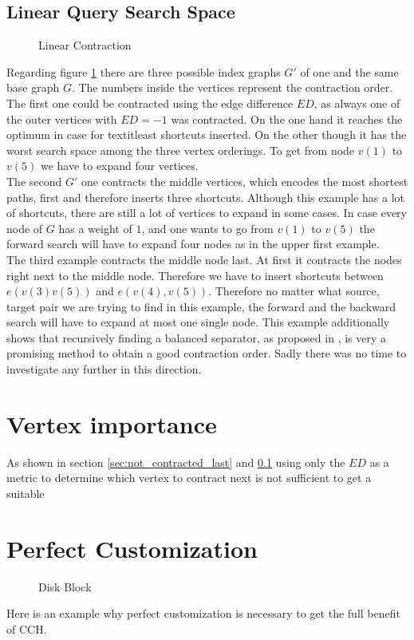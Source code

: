 \subsection{Linear Query Search Space}\label{sec:linear_query}

\begin{figure}
\centering

\caption{Linear Contraction}
\label{fig:linear_contraction}
\end{figure}

Regarding figure \ref{fig:linear_contraction} there are three possible index graphs $G'$ of one and the same base graph $G$. The numbers inside the vertices represent the contraction order.
\\
The first one could be contracted using the edge difference $ED$, as always one of the outer vertices with $ED=-1$ was contracted. On the one hand it reaches the optimum in case for textit{least shortcuts inserted}. On the other though it has the worst search space among the three vertex orderings. 
To get from node $v(1)$ to $v(5)$ we have to expand four vertices. 
\\
The second $G'$ one contracts the middle vertices, which encodes the most shortest paths, first and therefore inserts three shortcuts. Although this example has a lot of shortcuts, there are still a lot of vertices to expand in some cases. In case every node of $G$ has a weight of $1$, and one wants to go from $v(1)$ to $v(5)$ the forward search will have to expand four nodes as in the upper first example.
\\
The third example contracts the middle node last. At first it contracts the nodes right next to the middle node. Therefore we have to insert shortcuts between $e(v(3)v(5))$ and $e(v(4), v(5))$.
Therefore no matter what source, target pair we are trying to find in this example, the forward and the backward search will have to expand at most one single node. This example additionally shows that
recursively finding a balanced separator, as proposed in \cite[Customization Contraction Hierarchies]{CCH}, is very a promising method to obtain a good contraction order. Sadly there was no time to 
investigate any further in this direction.  

\section{Vertex importance}\label{sec:vertex_importance}

As shown in section \ref{sec:not_contracted_last} and \ref{sec:linear_query} using only the $ED$ as a metric to determine which vertex to contract next is not sufficient to get a suitable

\section{Perfect Customization}

\begin{figure}
    \centering
    
    \caption{Disk Block}
    \label{fig:perfectCustomization}
\end{figure}

Here is an example why perfect customization is necessary to get the full
benefit of CCH.
